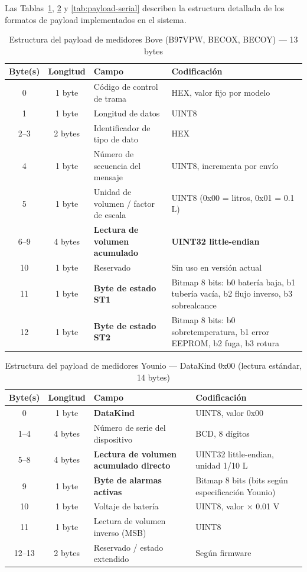 \documentclass[12pt,a4paper,oneside]{report}
\begin{document}
Las Tablas~\ref{tab:payload-bove}, \ref{tab:payload-younio00} y \ref{tab:payload-serial} describen la estructura detallada de los formatos de payload implementados en el sistema.

\begin{table}[H]
\caption{Estructura del payload de medidores Bove (B97VPW, BECOX, BECOY) --- 13 bytes}
\label{tab:payload-bove}
\centering
\begin{tabularx}{\textwidth}{ccXl}
\toprule
\textbf{Byte(s)} & \textbf{Longitud} & \textbf{Campo} & \textbf{Codificación} \\
\midrule
0 & 1 byte & Código de control de trama & HEX, valor fijo por modelo \\
1 & 1 byte & Longitud de datos & UINT8 \\
2--3 & 2 bytes & Identificador de tipo de dato & HEX \\
4 & 1 byte & Número de secuencia del mensaje & UINT8, incrementa por envío \\
5 & 1 byte & Unidad de volumen / factor de escala & UINT8 (0x00 = litros, 0x01 = 0.1 L) \\
6--9 & 4 bytes & \textbf{Lectura de volumen acumulado} & \textbf{UINT32 little-endian} \\
10 & 1 byte & Reservado & Sin uso en versión actual \\
11 & 1 byte & \textbf{Byte de estado ST1} & Bitmap 8 bits: b0 batería baja, b1 tubería vacía, b2 flujo inverso, b3 sobrealcance \\
12 & 1 byte & \textbf{Byte de estado ST2} & Bitmap 8 bits: b0 sobretemperatura, b1 error EEPROM, b2 fuga, b3 rotura \\
\bottomrule
\end{tabularx}
\end{table}

\begin{table}[H]
\caption{Estructura del payload de medidores Younio --- DataKind 0x00 (lectura estándar, 14 bytes)}
\label{tab:payload-younio00}
\centering
\begin{tabularx}{\textwidth}{ccXl}
\toprule
\textbf{Byte(s)} & \textbf{Longitud} & \textbf{Campo} & \textbf{Codificación} \\
\midrule
0 & 1 byte & \textbf{DataKind} & UINT8, valor 0x00 \\
1--4 & 4 bytes & Número de serie del dispositivo & BCD, 8 dígitos \\
5--8 & 4 bytes & \textbf{Lectura de volumen acumulado directo} & UINT32 little-endian, unidad 1/10 L \\
9 & 1 byte & \textbf{Byte de alarmas activas} & Bitmap 8 bits (bits según especificación Younio) \\
10 & 1 byte & Voltaje de batería & UINT8, valor × 0.01 V \\
11 & 1 byte & Lectura de volumen inverso (MSB) & UINT8 \\
12--13 & 2 bytes & Reservado / estado extendido & Según firmware \\
\bottomrule
\end{tabularx}
\end{table}
\end{document}
